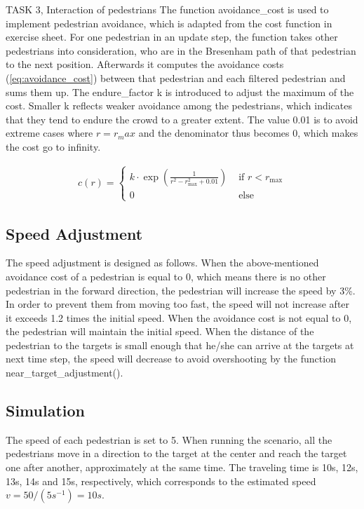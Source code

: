 \documentclass[10pt,a4paper]{article}
\begin{document}
\begin{task}{TASK 3, Interaction of pedestrians}
The function avoidance\_cost is used to implement pedestrian avoidance, which is adapted from the cost function in exercise sheet. For one pedestrian in an update step, the function takes other pedestrians into consideration, who are in the Bresenham path of that pedestrian to the next position. Afterwards it computes the avoidance costs (\autoref{eq:avoidance_cost}) between that pedestrian and each filtered pedestrian and sums them up. The endure\_factor k is introduced to adjust the maximum of the cost. Smaller k reflects weaker avoidance among the pedestrians, which indicates that they tend to endure the crowd to a greater extent. The value 0.01 is to avoid extreme cases where $r = r_max$ and the denominator thus becomes 0, which makes the cost go to infinity.

\begin{align}
    \label{eq:avoidance_cost}
    c(r)=\left\{\begin{array}{cc}
    k \cdot \exp \left(\frac{1}{r^{2}-r_{\max }^{2} + 0.01}\right) & \text { if } r<r_{\max } \\
    0 & \text { else }
    \end{array}\right.
\end{align}

\subsection{Speed Adjustment}

The speed adjustment is designed as follows. When the above-mentioned avoidance cost of a pedestrian is equal to 0, which means there is no other pedestrian in the forward direction, the pedestrian will increase the speed by 3\%. In order to prevent them from moving too fast, the speed will not increase after it exceeds 1.2 times the initial speed. When the avoidance cost is not equal to 0, the pedestrian will maintain the initial speed. When the distance of the pedestrian to the targets is small enough that he/she can arrive at the targets at next time step, the speed will decrease to avoid overshooting by the function near\_target\_adjustment().

\subsection{Simulation}

The speed of each pedestrian is set to 5. When running the scenario, all the pedestrians move in a direction to the target at the center and reach the target one after another, approximately at the same time. The traveling time is 10s, 12s, 13s, 14s and 15s, respectively, which corresponds to the estimated speed $v = 50 / (5s^{-1}) = 10s$.

\end{task}
\end{document}

